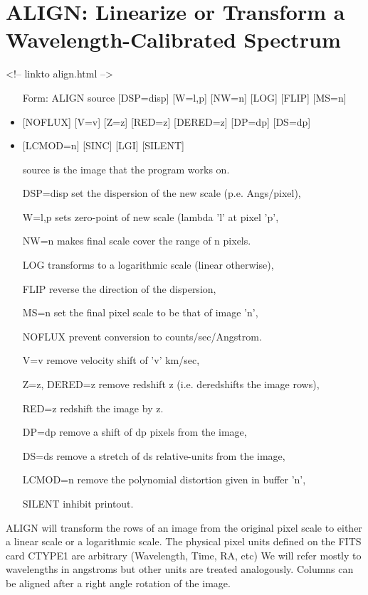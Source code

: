 \section{ALIGN: Linearize or Transform a Wavelength-Calibrated Spectrum}
\begin{rawhtml}
<!-- linkto align.html -->
\end{rawhtml}
\begin{itemize}
  \item[Form: ALIGN source {[DSP=disp]} {[W=l,p]} {[NW=n]} {[LOG]} 
       {[FLIP]} {[MS=n]}\hfill]{}
  \item{{[NOFLUX]} {[V=v]} {[Z=z]} {[RED=z]} {[DERED=z]} {[DP=dp]} {[DS=dp]}}
  \item{{[LCMOD=n]} {[SINC]} {[LGI]} {[SILENT]}}
  \item[source]{is the image that the program works on.}
  \item[DSP=disp]{set the dispersion of the new scale (p.e. Angs/pixel),}
  \item[W=l,p]{sets zero-point of new scale (lambda 'l' at pixel 'p',}
  \item[NW=n]{makes final scale cover the range of n pixels.}
  \item[LOG]{transforms to a logarithmic scale (linear otherwise),}
  \item[FLIP]{reverse the direction of the dispersion,}
  \item[MS=n]{set the final pixel scale to be that of image 'n',}
  \item[NOFLUX]{prevent conversion to counts/sec/Angstrom.}
  \item[V=v]{remove velocity shift of 'v' km/sec,}
  \item[Z=z, DERED=z]{remove redshift z (i.e. deredshifts the image rows),}
  \item[RED=z]{redshift the image by z.}
  \item[DP=dp]{remove a shift of dp pixels from the image,}
  \item[DS=ds]{remove a stretch of ds relative-units from the image,}
  \item[LCMOD=n]{remove the polynomial distortion given in buffer 'n',}
  \item[SILENT]{inhibit printout.}
\end{itemize}

ALIGN will transform the rows of an image from the original pixel scale to
either a linear scale or a logarithmic scale. The physical pixel units
defined on the FITS card CTYPE1 are arbitrary (Wavelength, Time, RA, etc)
We will refer mostly to wavelengths in angstroms but other units are
treated analogously. Columns can be aligned after a right angle rotation of
the image.
 
